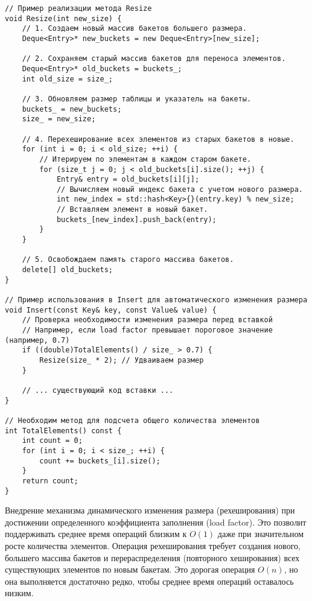 \documentclass[a4paper,12pt]{article}
\begin{document}
\begin{lstlisting}[style=cpp]
// Пример реализации метода Resize
void Resize(int new_size) {
    // 1. Создаем новый массив бакетов большего размера.
    Deque<Entry>* new_buckets = new Deque<Entry>[new_size];
    
    // 2. Сохраняем старый массив бакетов для переноса элементов.
    Deque<Entry>* old_buckets = buckets_;
    int old_size = size_;
    
    // 3. Обновляем размер таблицы и указатель на бакеты.
    buckets_ = new_buckets;
    size_ = new_size;
    
    // 4. Перехеширование всех элементов из старых бакетов в новые.
    for (int i = 0; i < old_size; ++i) {
        // Итерируем по элементам в каждом старом бакете.
        for (size_t j = 0; j < old_buckets[i].size(); ++j) {
            Entry& entry = old_buckets[i][j];
            // Вычисляем новый индекс бакета с учетом нового размера.
            int new_index = std::hash<Key>{}(entry.key) % new_size;
            // Вставляем элемент в новый бакет.
            buckets_[new_index].push_back(entry);
        }
    }
    
    // 5. Освобождаем память старого массива бакетов.
    delete[] old_buckets;
}

// Пример использования в Insert для автоматического изменения размера
void Insert(const Key& key, const Value& value) {
    // Проверка необходимости изменения размера перед вставкой
    // Например, если load factor превышает пороговое значение (например, 0.7)
    if ((double)TotalElements() / size_ > 0.7) {
        Resize(size_ * 2); // Удваиваем размер
    }
    
    // ... существующий код вставки ...
}

// Необходим метод для подсчета общего количества элементов
int TotalElements() const {
    int count = 0;
    for (int i = 0; i < size_; ++i) {
        count += buckets_[i].size();
    }
    return count;
}
\end{lstlisting}
Внедрение механизма динамического изменения размера (рехеширования) при достижении определенного коэффициента заполнения (load factor). Это позволит поддерживать среднее время операций близким к \(O(1)\) даже при значительном росте количества элементов. Операция рехеширования требует создания нового, большего массива бакетов и перераспределения (повторного хеширования) всех существующих элементов по новым бакетам. Это дорогая операция \(O(n)\), но она выполняется достаточно редко, чтобы среднее время операций оставалось низким.
\end{document}

